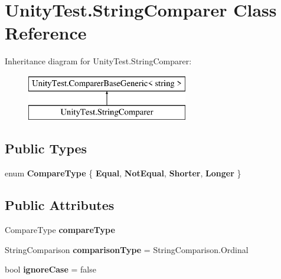 \hypertarget{class_unity_test_1_1_string_comparer}{}\section{Unity\+Test.\+String\+Comparer Class Reference}
\label{class_unity_test_1_1_string_comparer}
Inheritance diagram for Unity\+Test.\+String\+Comparer\+:\begin{figure}[H]
\begin{center}
\leavevmode
\includegraphics[height=2.000000cm]{class_unity_test_1_1_string_comparer}
\end{center}
\end{figure}
\subsection*{Public Types}
\begin{DoxyCompactItemize}
\item 
\mbox{\label{class_unity_test_1_1_string_comparer_af4abd151294e7c4a81c237bf7440623a}} 
enum {\bfseries Compare\+Type} \{ {\bfseries Equal}, 
{\bfseries Not\+Equal}, 
{\bfseries Shorter}, 
{\bfseries Longer}
 \}
\end{DoxyCompactItemize}
\subsection*{Public Attributes}
\begin{DoxyCompactItemize}
\item 
\mbox{\label{class_unity_test_1_1_string_comparer_a565f7bd0f4199d5d3f36a448e59eec0a}} 
Compare\+Type {\bfseries compare\+Type}
\item 
\mbox{\label{class_unity_test_1_1_string_comparer_add6ece6f187370d409e875c879da4f8c}} 
String\+Comparison {\bfseries comparison\+Type} = String\+Comparison.\+Ordinal
\item 
\mbox{\label{class_unity_test_1_1_string_comparer_aa4e0caceb3b0d2caf9b4a88255a8303f}} 
bool {\bfseries ignore\+Case} = false
\end{DoxyCompactItemize}
